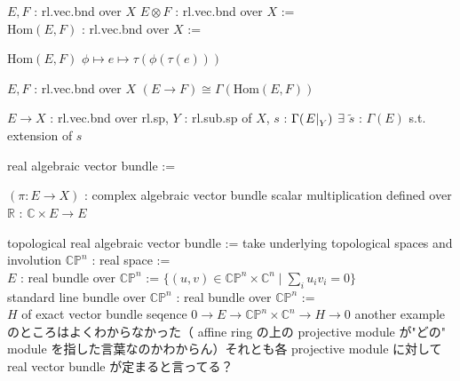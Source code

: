 \documentclass[dvipdfmx]{jsarticle}
\begin{document}
\begin{Definition}
\itemwhen
  \For \(E,F\) : rl.vec.bnd over \(X\)
\itemdefi
  \Define \(E \otimes F\) : rl.vec.bnd over \(X\) :=  \\
  \Define \(\text{Hom}(E,F)\) : rl.vec.bnd over \(X\) :=
  \begin{itemize}
    \itembase \(\text{Hom}(E,F)\)
    \itemenum \(\phi \mapsto e \mapsto \tau(\phi(\tau(e)))\)
  \end{itemize}
\end{Definition}

\begin{Theorem}
\itemwhen
  \For \(E,F\) : rl.vec.bnd over \(X\)
\itemprop
  \Then \((E \to F) \cong \Gamma(\text{Hom}(E,F))\)
\end{Theorem}


\begin{Theorem}
\itemwhen
  \For \(E \to X\) : rl.vec.bnd over rl.sp, \(Y\) : rl.sub.sp of \(X\), \(s\) : \(\Gamma(\left. {E} \right| _{Y})\)
\itemprop
  \Then \(\exists\) \(\tilde{s}\) : \(\Gamma(E)\) s.t. extension of \(s\)
\end{Theorem}

\begin{Definition}
\itemdefi
  \Define real algebraic vector bundle :=
  \begin{itemize}
    \itembase \((\pi : E \to X)\) : complex algebraic vector bundle
    \itemenum scalar multiplication defined over \(\mathbb{R}\) : \(\mathbb{C} \times E \to E\)
  \end{itemize}
  \Define topological real algebraic vector bundle := take underlying topological spaces and involution
\itemdefi
  \Let \(\mathbb{CP}^{n}\) : real space :=  \\
  \Let \(E\) : real bundle over \(\mathbb{CP}^{n}\) := \(\{(u,v) \in \mathbb{CP}^{n} \times \mathbb{C}^{n} \mid \sum_{i} u_{i} v_{i} = 0\}\) \\
  \Define standard line bundle over \(\mathbb{CP}^{n}\) : real bundle over \(\mathbb{CP}^{n}\) := \\
  \(H\) of exact vector bundle seqence \(0 \to E \to \mathbb{CP}^{n} \times \mathbb{C}^{n} \to H \to 0\)
\itemdefi
  \SORRY
  another example のところはよくわからなかった（ affine ring の上の projective module が"どの" module を指した言葉なのかわからん）それとも各 projective module に対して real vector bundle が定まると言ってる？
\end{Definition}
\end{document}
